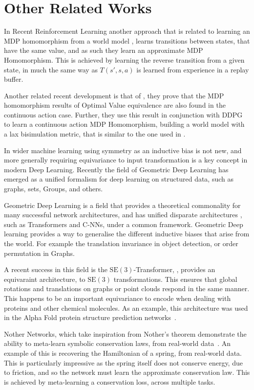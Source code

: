 \section{Other Related Works}
In Recent Reinforcement Learning another approach that is related to learning an MDP homomorphism from a world model \cite{mavor2022simple}, learns transitions between states, that have the same value, and as such they learn an approximate MDP Homomorphism. This is achieved by learning the reverse transition from a given state, in much the same way as $T(s', s, a)$ is learned from experience in a replay buffer.

Another related recent development is that of \cite{rezaei2022continuous}, they prove that the MDP homomorphism results of Optimal Value equivalence are also found in the continuous action case. Further, they use this result in conjunction with DDPG\cite{lillicrap2015continuous} to learn a continuous action MDP Homomorphism, building a world model with a lax bisimulation metric, that is similar to the one used in \cite{van2020plannable}.

In wider machine learning using symmetry as an inductive bias is not new, and more generally requiring equivariance to input transformation is a key concept in modern Deep Learning. Recently the field of Geometric Deep Learning has emerged as a unified formalism for deep learning on structured data, such as graphs, sets, Groups, and others.

Geometric Deep Learning is a field that provides a theoretical commonality for many successful network architectures, and has unified disparate architectures \cite{bronstein2021geometric}, such as Transformers and C-NNs, under a common framework. Geometric Deep learning provides a way to generalise the different inductive biases that arise from the world. For example the translation invariance in object detection, or order permutation in Graphs.

A recent success in this field is the $\text{SE}(3)$-Transformer, \cite{fuchs2020se}, provides an equivaraint architecture, to $\text{SE}(3)$ transformations. This ensures that global rotations and translations on graphs or point clouds respond in the same manner. This happens to be an important equivariance to encode when dealing with proteins and other chemical molecules. As an example, this architecture was used in the Alpha Fold protein structure prediction networks~\cite{jumper2021highly}.

Nother Networks, which take inspiration from Nother's theorem demonstrate the ability to meta-learn symbolic conservation laws, from real-world data~\cite{alet2021noether}. An example of this is recovering the Hamiltonian of a spring, from real-world data. This is particularly impressive as the spring itself does not conserve energy, due to friction, and so the network must learn the approximate conservation law. This is achieved by meta-learning a conservation loss, across multiple tasks.



